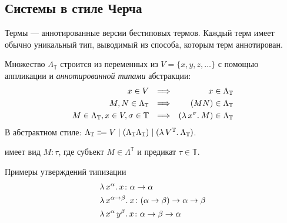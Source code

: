 \documentclass[11pt,a4paper]{article}
\begin{document}
\subsection{Системы в стиле Черча}
Термы --- аннотированные версии бестиповых термов. Каждый терм имеет обычно уникальный тип, выводимый из способа, которым терм аннотирован.
\begin{defn}[Предтермы]
	Множество  $ \Lambda_{\mathbb{T}}$ строится из переменных из $ V = \{x, y, z, \ldots \}$ с помощью аппликации и \textit{аннотированной типами} абстракции:
	\[
	\begin{aligned}
		x \in V && \Longrightarrow && x \in \Lambda _{\mathbb{T}}\\
		M, N \in \Lambda_{\mathbb{T}} && \Longrightarrow && (MN) \in \Lambda _{\mathbb{T}}\\
		M \in \Lambda_{\mathbb{T}}, x \in V, \sigma \in {\mathbb{T}} && \Longrightarrow && (\lambda\,{x^{\sigma}}.\:{M}) \in \Lambda_{\mathbb{T}}
	\end{aligned}
	\]
	В абстрактном стиле: $ \Lambda _{\mathbb{T}}\Coloneqq V \mid (\Lambda_{\mathbb{T}} \Lambda_{\mathbb{T}}) \mid (\lambda\,{V^{\mathbb{T}}}.\:{\Lambda_{\mathbb{T}}})$.
\end{defn}
\begin{defn}
	 имеет вид $ M \colon  \tau $, где субъект $ M \in \Lambda^{\mathbb{T}}$ и предикат $ \tau \in \mathbb{T}$.
\end{defn}
\begin{ex}
	Примеры утверждений типизации
    \[
    \begin{aligned}
		&\lambda\,{x^{\alpha}}.\:{x} \colon \alpha \to \alpha \\
		& \lambda\,{x^{ \alpha \to  \beta }}.\:{x}\colon ( \alpha  \to  \beta ) \to \alpha \to  \beta \\
		& \lambda\,{x^{\alpha} \, y^{ \beta }}.\:{x} \colon  \alpha  \to \beta  \to \alpha 
    \end{aligned}
    \]
\end{ex}
\end{document}

